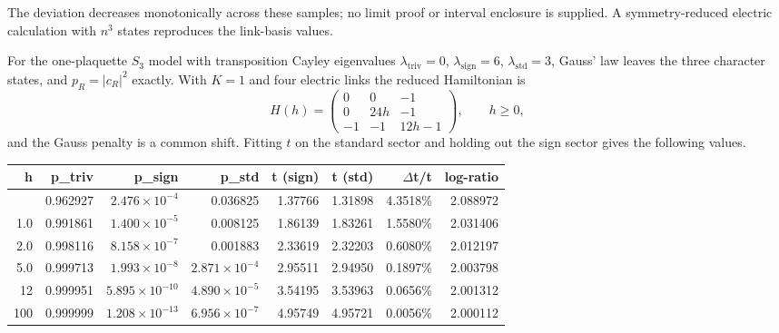 \documentclass[11pt]{article}
\begin{document}
The deviation decreases monotonically across these samples; no limit proof
or interval enclosure is supplied. A symmetry-reduced electric calculation
with \(n^3\) states reproduces the link-basis values.

For the one-plaquette \(S_3\) model with transposition Cayley eigenvalues
\(\lambda_{\mathrm{triv}}=0\), \(\lambda_{\mathrm{sign}}=6\),
\(\lambda_{\mathrm{std}}=3\), Gauss' law leaves the three character states, and
\(p_R=|c_R|^2\) exactly. With \(K=1\) and four electric links the reduced
Hamiltonian is
\[
H(h)=\begin{pmatrix}
0&0&-1\\
0&24h&-1\\
-1&-1&12h-1
\end{pmatrix},\qquad h\geq0,
\]
and the Gauss penalty is a common shift. Fitting \(t\) on the standard sector
and holding out the sign sector gives the following values.

{\def\LTcaptype{none}
\small
\setlength{\tabcolsep}{4pt}
\begin{longtable}[]{@{}rrrrrrrr@{}}
\toprule\noalign{}
h & p\_triv & p\_sign & p\_std & t (sign) & t (std) & \ensuremath{\Delta}t/t & log-ratio \\
\midrule\noalign{}
\endhead
\bottomrule\noalign{}
\endlastfoot
0.5 & 0.962927 & \(2.476\!\times\!10^{-4}\) & 0.036825 & 1.37766 & 1.31898 & 4.3518\% & 2.088972 \\
1.0 & 0.991861 & \(1.400\!\times\!10^{-5}\) & 0.008125 & 1.86139 & 1.83261 & 1.5580\% & 2.031406 \\
2.0 & 0.998116 & \(8.158\!\times\!10^{-7}\) & 0.001883 & 2.33619 & 2.32203 & 0.6080\% & 2.012197 \\
5.0 & 0.999713 & \(1.993\!\times\!10^{-8}\) & \(2.871\!\times\!10^{-4}\) & 2.95511 & 2.94950 & 0.1897\% & 2.003798 \\
12 & 0.999951 & \(5.895\!\times\!10^{-10}\) & \(4.890\!\times\!10^{-5}\) & 3.54195 & 3.53963 & 0.0656\% & 2.001312 \\
100 & 0.999999 & \(1.208\!\times\!10^{-13}\) & \(6.956\!\times\!10^{-7}\) & 4.95749 & 4.95721 & 0.0056\% & 2.000112 \\
\end{longtable}
}
\end{document}
